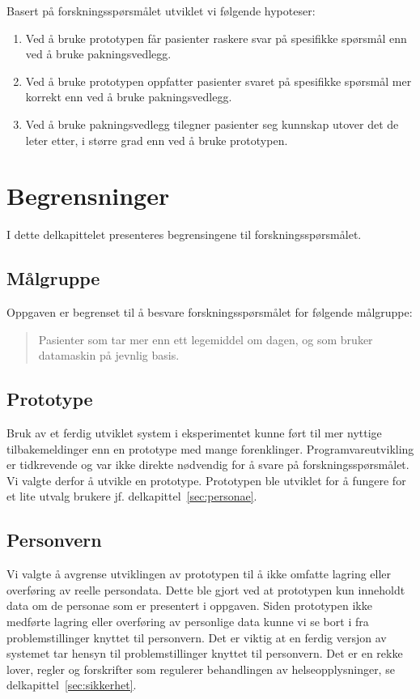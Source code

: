 Basert på forskningsspørsmålet utviklet vi følgende hypoteser:
\begin{enumerate}
 \item Ved å bruke prototypen får pasienter raskere svar på spesifikke spørsmål enn ved å bruke pakningsvedlegg.
 \item Ved å bruke prototypen oppfatter pasienter svaret på spesifikke spørsmål mer korrekt enn ved å bruke pakningsvedlegg.
 \item Ved å bruke pakningsvedlegg tilegner pasienter seg kunnskap utover det de leter etter, i større grad enn ved å bruke prototypen. 
\end{enumerate}


\section{Begrensninger}
I dette delkapittelet presenteres begrensingene til forskningsspørsmålet.

\subsection{Målgruppe} \label{subsec:maalgruppe}
Oppgaven er begrenset til å besvare forskningsspørsmålet for følgende målgruppe:
\begin{quote}Pasienter som tar mer enn ett legemiddel om dagen, og som bruker datamaskin på jevnlig basis.\end{quote}

\subsection{Prototype}
Bruk av et ferdig utviklet system i eksperimentet kunne ført til mer nyttige tilbakemeldinger enn en prototype med mange forenklinger. Programvareutvikling er tidkrevende og var ikke direkte nødvendig for å svare på forskningsspørsmålet. Vi valgte derfor å utvikle en prototype. Prototypen ble utviklet for å fungere for et lite utvalg brukere jf. delkapittel~\ref{sec:personae}. 

\subsection{Personvern}
Vi valgte å avgrense utviklingen av prototypen til å ikke omfatte lagring eller overføring av reelle persondata. Dette ble gjort ved at prototypen kun inneholdt data om de personae som er presentert i oppgaven. Siden prototypen ikke medførte lagring eller overføring av personlige data kunne vi se bort i fra problemstillinger knyttet til personvern. Det er viktig at en ferdig versjon av systemet tar hensyn til problemstillinger knyttet til personvern. Det er en rekke lover, regler og forskrifter som regulerer behandlingen av helseopplysninger, se delkapittel~\ref{sec:sikkerhet}. 

